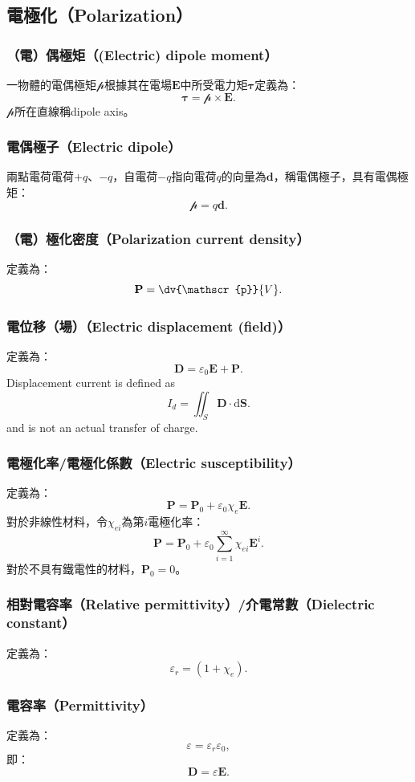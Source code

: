 \documentclass[a4paper,12pt]{report}
\begin{document}
\begin{itemize}
\subsection{電極化（Polarization）}
\subsubsection{（電）偶極矩（(Electric) dipole moment）}
一物體的電偶極矩$\mathscr{p}$根據其在電場$\mathbf{E}$中所受電力矩$\boldsymbol{\tau}$定義為：
\[\boldsymbol{\tau} = \mathscr{p} \times \mathbf{E}.\]
$\mathscr{p}$所在直線稱dipole axis。
\subsubsection{電偶極子（Electric dipole）}
兩點電荷電荷$+q$、$-q$，自電荷$-q$指向電荷$q$的向量為$\mathbf{d}$，稱電偶極子，具有電偶極矩：
\[\mathscr{p}=q\mathbf{d}.\]
\subsubsection{（電）極化密度（Polarization current density）}
定義為：
\[\mathbf{P}=\dv{\mathscr{p}}{V}.\]
\subsubsection{電位移（場）（Electric displacement (field)）}
定義為：
\[\mathbf{D} = \varepsilon_0 \mathbf{E} + \mathbf{P}.\]
Displacement current is defined as
\[I_d=\iint _{S}\mathbf {D} \cdot \mathrm{d}\mathbf{S}.\]
and is not an actual transfer of charge.
\subsubsection{電極化率/電極化係數（Electric susceptibility）}
定義為：
\[\mathbf{P}=\mathbf{P}_0+\varepsilon_0\chi_e\mathbf{E}.\]
對於非線性材料，令$\chi_{ei}$為第$i$電極化率：
\[\mathbf{P}=\mathbf{P}_0+\varepsilon_0\sum_{i=1}^{\infty}\chi_{ei}\mathbf{E}^i.\]
對於不具有鐵電性的材料，$\mathbf{P}_0=0$。
\subsubsection{相對電容率（Relative permittivity）/介電常數（Dielectric constant）}
定義為：
\[\varepsilon_r=(1+\chi_e).\]
\subsubsection{電容率（Permittivity）}
定義為：
\[\varepsilon=\varepsilon_r\varepsilon_0,\]
即：
\[\mathbf{D} = \varepsilon\mathbf{E}.\]

\end{itemize}
\end{document}
